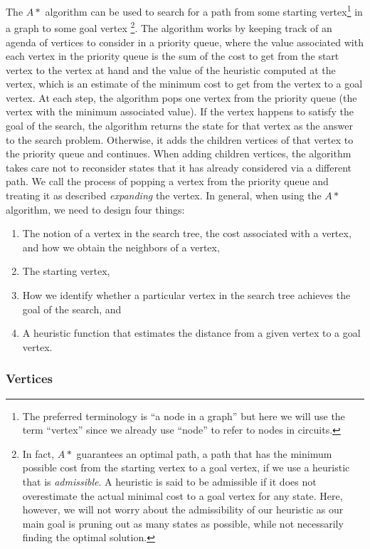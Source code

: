 The $A*$ algorithm can be used to search for a path from some starting
vertex\footnote{The preferred terminology is ``a node in a graph'' but here we
will use the term ``vertex'' since we already use ``node'' to refer to nodes in
circuits.} in
a graph to some goal vertex \footnote{In fact, $A*$ guarantees an optimal path, a
path that has the minimum possible cost from the starting vertex to a goal
vertex, if we use a heuristic that is \emph{admissible}. A heuristic is said to
be admissible if it does not overestimate the actual minimal cost to a goal
vertex
for any state. Here, however, we will not worry about the admissibility of our
heuristic as our main goal is pruning out as many states as possible, while not
necessarily finding the optimal solution.}.
The algorithm works by keeping track of an agenda
of vertices to consider
in a priority queue, where the value associated with each vertex in the priority
queue is the sum of the cost to get from the start vertex to the vertex at hand
and the value of the heuristic
computed at the vertex, which is an estimate of the minimum
cost to get from the vertex to a goal vertex.
At each step, the algorithm pops
one vertex from the priority queue (the vertex with the minimum associated
value). If the vertex happens to satisfy the goal of
the search, the algorithm returns the state for that vertex as the answer to
the search
problem. Otherwise, it adds the children vertices of that vertex to the priority
queue and continues. When adding children vertices, the algorithm takes care not
to reconsider
states that it has already considered via a different path. We call the process
of popping a vertex from the priority queue and treating it as described
\emph{expanding} the vertex.
In general, when using the $A*$ algorithm, we need to design four things:

\begin{enumerate}
\item The notion of a vertex in the
search tree, the cost associated with a vertex, and how we obtain the neighbors
of a vertex,
\item The starting vertex,
\item How we identify whether a particular vertex in the search tree achieves
the goal of the search, and
\item A heuristic function that estimates the distance from a given vertex to a
goal vertex.
\end{enumerate}

\subsubsection{Vertices}
\label{sec:vertices}

